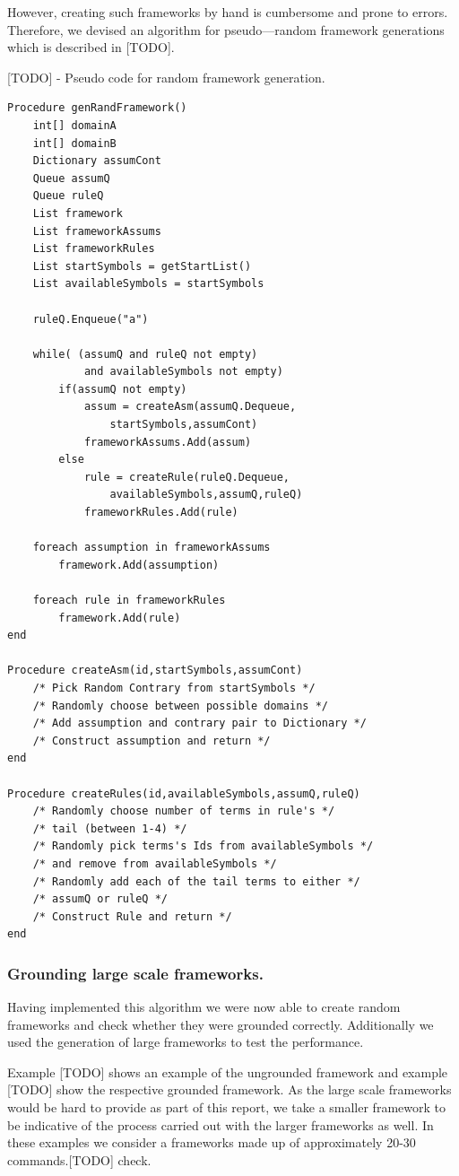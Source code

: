 However, creating such frameworks by hand is cumbersome and prone to errors. Therefore, we devised an algorithm for pseudo---random framework generations which is described in [TODO].

[TODO] - Pseudo code for random framework generation.
\begin{Verbatim}[frame=single]
Procedure genRandFramework()
	int[] domainA
	int[] domainB
	Dictionary assumCont
	Queue assumQ
	Queue ruleQ
	List framework
	List frameworkAssums
	List frameworkRules
	List startSymbols = getStartList()
	List availableSymbols = startSymbols
	
	ruleQ.Enqueue("a")
	
	while( (assumQ and ruleQ not empty) 
			and availableSymbols not empty)
		if(assumQ not empty)
			assum = createAsm(assumQ.Dequeue,
				startSymbols,assumCont)
			frameworkAssums.Add(assum)
		else
			rule = createRule(ruleQ.Dequeue,
				availableSymbols,assumQ,ruleQ)
			frameworkRules.Add(rule)
			
	foreach assumption in frameworkAssums
		framework.Add(assumption)
	
	foreach rule in frameworkRules
		framework.Add(rule)
end
		
Procedure createAsm(id,startSymbols,assumCont)
	/* Pick Random Contrary from startSymbols */
	/* Randomly choose between possible domains */
	/* Add assumption and contrary pair to Dictionary */
	/* Construct assumption and return */
end

Procedure createRules(id,availableSymbols,assumQ,ruleQ)
	/* Randomly choose number of terms in rule's */
	/* tail (between 1-4) */
	/* Randomly pick terms's Ids from availableSymbols */
	/* and remove from availableSymbols */
	/* Randomly add each of the tail terms to either */
	/* assumQ or ruleQ */
	/* Construct Rule and return */
end

\end{Verbatim}

\subsubsection{Grounding large scale frameworks.}

Having implemented this algorithm we were now able to create random frameworks and check whether they were grounded correctly. Additionally we used the generation of large frameworks to test the performance.

Example [TODO] shows an example of the ungrounded framework and example [TODO] show the respective grounded framework. As the large scale frameworks would be hard to provide as part of this report, we take a smaller framework to be indicative of the process carried out with the larger frameworks as well. In these examples we consider a frameworks made up of approximately 20-30 commands.[TODO] check.

